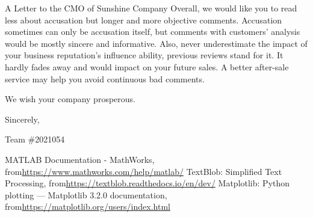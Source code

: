 \documentclass[12pt]{article}  %
\begin{document}
\begin{letter}{A Letter to the CMO of Sunshine Company}
​Overall, we would like you to read less about accusation but longer and more objective comments. Accusation sometimes can only be accusation itself, but comments with customers' analysis would be mostly sincere and informative. Also, never underestimate the impact of your business reputation’s influence ability, previous reviews stand for it. It hardly fades away and would impact on your future sales. A better after-sale service may help you avoid continuous bad comments.

​We wish your company prosperous.

\begin{flushright}
 Sincerely,

Team \#2021054

\end{flushright}
\end{letter}


\begin{thebibliography}{99}
 MATLAB Documentation - MathWorks, from\url{https://www.mathworks.com/help/matlab/}
 TextBlob: Simplified Text Processing, from\url{https://textblob.readthedocs.io/en/dev/}
 Matplotlib: Python plotting — Matplotlib 3.2.0 documentation, from\url{https://matplotlib.org/users/index.html}

\end{thebibliography}
\end{document}
